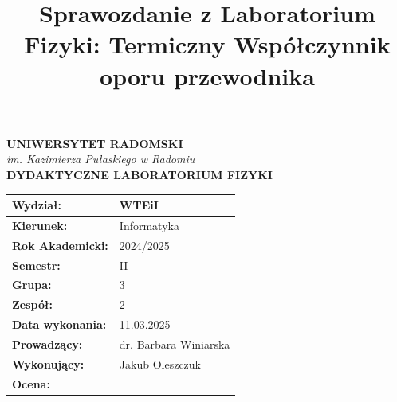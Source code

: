 \documentclass[11pt]{article}
\title{Sprawozdanie z Laboratorium Fizyki: Termiczny Współczynnik oporu przewodnika}
\date{}
\begin{document}
\thispagestyle{empty} %

\begin{center}
    {\Large\textbf{UNIWERSYTET RADOMSKI}} \\
    \textit{im. Kazimierza Pułaskiego w Radomiu} \\
    \vspace{0.3cm}
    {\large\textbf{DYDAKTYCZNE LABORATORIUM FIZYKI}} \\
\end{center}

\vspace{1.5cm}

\begin{center}
\end{center}

\vspace{1.5cm}

\begin{center}
\begin{tabular}{|>{\bfseries}p{4cm}|p{6cm}|}
\hline
Wydział: & WTEiI \\
\hline
Kierunek: & Informatyka \\
\hline
Rok Akademicki: & 2024/2025 \\
\hline
Semestr: & II \\
\hline
Grupa: & 3 \\
\hline
Zespół: & 2 \\
\hline
Data wykonania: & 11.03.2025 \\
\hline
Prowadzący: & dr. Barbara Winiarska \\
\hline
Wykonujący: & Jakub Oleszczuk \\
\hline
Ocena: &  \\
\hline
\end{tabular}
\end{center}

\vspace{2cm}
\end{document}
